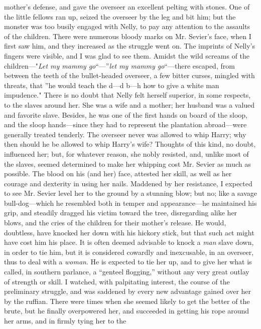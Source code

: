 mother's defense, and gave the overseer an excellent pelting with
stones. One of the little fellows ran up, seized the overseer by the leg
and bit him; but the monster was too busily engaged with Nelly, to pay
any attention to the assaults of the children. There were numerous
bloody marks on Mr. Sevier's face, when I first saw him, and they
increased as the struggle went on. The imprints of Nelly's fingers were
visible, and I was glad to see them. Amidst the wild screams of the
children---"\emph{Let my mammy go}``---''\emph{let my mammy
go}``---there escaped, from between the teeth of the bullet-headed
overseer, a few bitter curses, mingled with threats, that ''he would
teach the d---d b---h how to give a white man impudence." There is no
doubt that Nelly felt herself superior, in some respects, to the slaves
around her. She was a wife and a mother; her husband was a valued and
favorite slave. Besides, he was one of the first hands on board of the
sloop, and the sloop hands---since they had to represent the plantation
abroad---were generally treated tenderly. The overseer never was allowed
to whip Harry; why then should he be allowed to whip Harry's wife?
Thoughts of this kind, no doubt, influenced her; but, for whatever
reason, she nobly resisted, and, unlike most of the slaves, seemed
determined to make her whipping {}cost Mr. Sevier as much as possible.
The blood on his (and her) face, attested her skill, as well as her
courage and dexterity in using her nails. Maddened by her resistance, I
expected to see Mr. Sevier level her to the ground by a stunning blow;
but no; like a savage bull-dog---which he resembled both in temper and
appearance---he maintained his grip, and steadily dragged his victim
toward the tree, disregarding alike her blows, and the cries of the
children for their mother's release. He would, doubtless, have knocked
her down with his hickory stick, but that such act might have cost him
his place. It is often deemed advisable to knock a \emph{man} slave
down, in order to tie him, but it is considered cowardly and
inexcusable, in an overseer, thus to deal with a \emph{woman}. He is
expected to tie her up, and to give her what is called, in southern
parlance, a ``genteel flogging,'' without any very great outlay of
strength or skill. I watched, with palpitating interest, the course of
the preliminary struggle, and was saddened by every new advantage gained
over her by the ruffian. There were times when she seemed likely to get
the better of the brute, but he finally overpowered her, and succeeded
in getting his rope around her arms, and in firmly tying her to the
